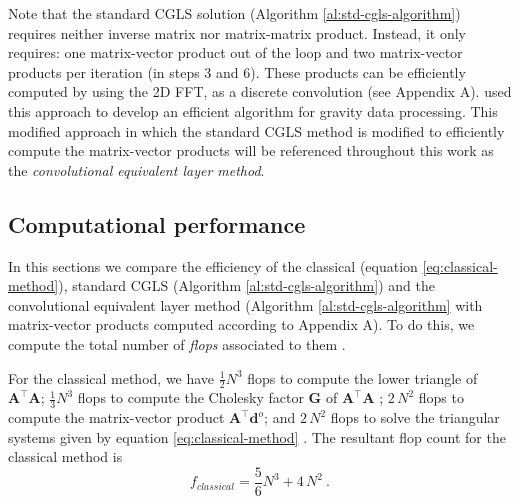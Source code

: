 \documentclass[manuscript]{geophysics}
\begin{document}
	Note that the standard CGLS solution (Algorithm \ref{al:std-cgls-algorithm}) requires 
	neither inverse matrix nor matrix-matrix product. Instead, it only requires: one matrix-vector 
	product out of the loop and two matrix-vector products per iteration (in steps 3 and 6). 
	These products can be efficiently computed by using the 2D FFT, as a discrete convolution
	(see Appendix A). \citet{takahashi2020convolutional} used this approach
	to develop an efficient algorithm for gravity data processing. This modified approach in which
	the standard CGLS method is modified to efficiently compute the matrix-vector products will be 
	referenced throughout this work as the \textit{convolutional equivalent layer method}.
	
	\subsection{Computational performance}
	
	In this sections we compare the efficiency of the classical (equation \ref{eq:classical-method}), 
	standard CGLS (Algorithm \ref{al:std-cgls-algorithm}) and the convolutional equivalent 
	layer method (Algorithm \ref{al:std-cgls-algorithm} with matrix-vector products computed 
	according to Appendix A). To do this, we compute the total number of 
	\textit{flops} associated to them \citep[][ p. 12]{golub-vanloan2013}.
	
	For the classical method, we have $\tfrac{1}{2} N^3$ flops to compute the lower triangle of
	$\mathbf{A}^{\top}\mathbf{A}$; $\tfrac{1}{3} N^3$ flops to compute the Cholesky factor
	$\mathbf{G}$ of $\mathbf{A}^{\top}\mathbf{A}$ \citep[][ p.~164]{golub-vanloan2013};
	$2 \, N^2$ flops to compute the matrix-vector product $\mathbf{A}^{\top} \mathbf{d}^{o}$;
	and $2 \, N^2$ flops to solve the triangular systems given by equation \ref{eq:classical-method}
	\citep[][ p.~106]{golub-vanloan2013}. The resultant flop count for the classical method is
	\begin{equation}
		f_{classical} =  \dfrac{5}{6} N^{3} + 4 \, N^{2}\: .
		\label{eq:flops-classical-method}
	\end{equation}
	
	
\end{document}

